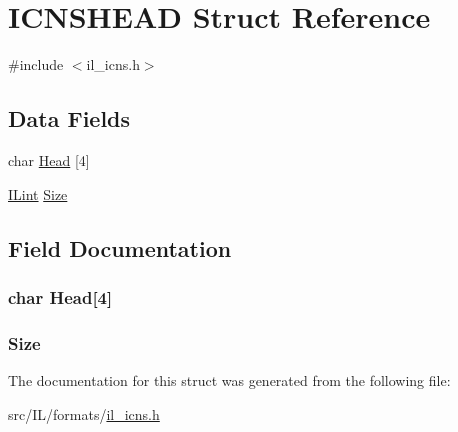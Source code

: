 \hypertarget{struct_i_c_n_s_h_e_a_d}{\section{I\-C\-N\-S\-H\-E\-A\-D Struct Reference}
\label{struct_i_c_n_s_h_e_a_d}
}


{\ttfamily \#include $<$il\-\_\-icns.\-h$>$}

\subsection*{Data Fields}
\begin{DoxyCompactItemize}
\item 
char \hyperlink{struct_i_c_n_s_h_e_a_d_aa66854d9f94d86824e715cc009a104d7}{Head} \mbox{[}4\mbox{]}
\item 
\hyperlink{il_8h_a288a97fb9e92e707a60b749d0039fafe}{I\-Lint} \hyperlink{struct_i_c_n_s_h_e_a_d_a79baeeee1ab272b95715f56b698506c7}{Size}
\end{DoxyCompactItemize}


\subsection{Field Documentation}
\hypertarget{struct_i_c_n_s_h_e_a_d_aa66854d9f94d86824e715cc009a104d7}{
\subsubsection[{Head}]{\setlength{\rightskip}{0pt plus 5cm}char Head\mbox{[}4\mbox{]}}}\label{struct_i_c_n_s_h_e_a_d_aa66854d9f94d86824e715cc009a104d7}
\hypertarget{struct_i_c_n_s_h_e_a_d_a79baeeee1ab272b95715f56b698506c7}{
\subsubsection[{Size}]{ Size}}\label{struct_i_c_n_s_h_e_a_d_a79baeeee1ab272b95715f56b698506c7}


The documentation for this struct was generated from the following file\-:\begin{DoxyCompactItemize}
\item 
src/\-I\-L/formats/\hyperlink{il__icns_8h}{il\-\_\-icns.\-h}\end{DoxyCompactItemize}
